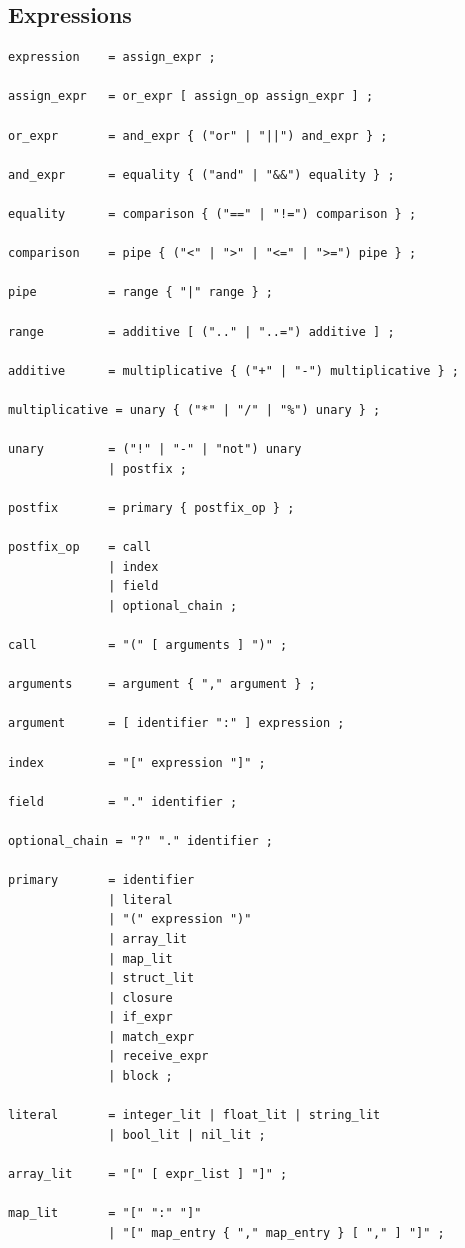 \subsection{Expressions}

\begin{lstlisting}[language=EBNF]
expression    = assign_expr ;

assign_expr   = or_expr [ assign_op assign_expr ] ;

or_expr       = and_expr { ("or" | "||") and_expr } ;

and_expr      = equality { ("and" | "&&") equality } ;

equality      = comparison { ("==" | "!=") comparison } ;

comparison    = pipe { ("<" | ">" | "<=" | ">=") pipe } ;

pipe          = range { "|" range } ;

range         = additive [ (".." | "..=") additive ] ;

additive      = multiplicative { ("+" | "-") multiplicative } ;

multiplicative = unary { ("*" | "/" | "%") unary } ;

unary         = ("!" | "-" | "not") unary
              | postfix ;

postfix       = primary { postfix_op } ;

postfix_op    = call
              | index
              | field
              | optional_chain ;

call          = "(" [ arguments ] ")" ;

arguments     = argument { "," argument } ;

argument      = [ identifier ":" ] expression ;

index         = "[" expression "]" ;

field         = "." identifier ;

optional_chain = "?" "." identifier ;

primary       = identifier
              | literal
              | "(" expression ")"
              | array_lit
              | map_lit
              | struct_lit
              | closure
              | if_expr
              | match_expr
              | receive_expr
              | block ;

literal       = integer_lit | float_lit | string_lit
              | bool_lit | nil_lit ;

array_lit     = "[" [ expr_list ] "]" ;

map_lit       = "[" ":" "]"
              | "[" map_entry { "," map_entry } [ "," ] "]" ;


\end{lstlisting}
